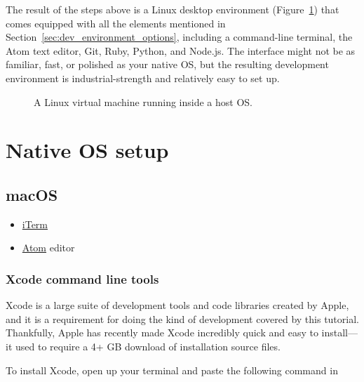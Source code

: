 The result of the steps above is a Linux desktop environment (Figure~\ref{fig:virtual_machine}) that comes equipped with all the elements mentioned in Section~\ref{sec:dev_environment_options}, including a command-line terminal, the Atom text editor, Git, Ruby, Python, and Node.js. The interface might not be as familiar, fast, or polished as your native OS, but the resulting development environment is industrial-strength and relatively easy to set up.

\begin{figure}
\begin{center}
\end{center}
\caption{A Linux virtual machine running inside a host OS.\label{fig:virtual_machine}}
\end{figure}



\section{Native OS setup} %
\label{sec:native_os_setup}

\subsection{macOS} %
\label{sec:macos}

\begin{itemize}
  \item \href{https://www.iterm2.com/downloads.html}{iTerm}
  \item \href{https://atom.io/}{Atom} editor
\end{itemize}


\subsubsection{Xcode command line tools}

\label{sec:shiny_xcode}

Xcode is a large suite of development tools and code libraries created by Apple, and it is a requirement for doing the kind of development covered by this tutorial. Thankfully, Apple has recently made Xcode incredibly quick and easy to install---it used to require a 4+ GB download of installation source files.

To install Xcode, open up your terminal and paste the following command in

\begin{codelisting}
\label{code:xcode-install}
\end{codelisting}

